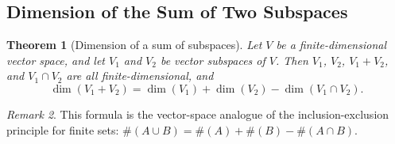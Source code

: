 \documentclass[11pt, a4paper, notitlepage]{report}
\newtheorem{theorem}{Theorem}[section]
\theoremstyle{definition}
\theoremstyle{remark}
\newtheorem{remark}[theorem]{Remark}
\begin{document}
\subsection{Dimension of the Sum of Two Subspaces}

\begin{theorem}[Dimension of a sum of subspaces]\label{thm:dim-sum}
Let $V$ be a finite-dimensional vector space, and let $V_1$ and $V_2$ be vector subspaces of $V$. Then $V_1$, $V_2$, $V_1 + V_2$, and $V_1\cap V_2$ are all finite-dimensional, and
\[
  \dim(V_1 + V_2) = \dim(V_1) + \dim(V_2) - \dim(V_1\cap V_2).
\]
\end{theorem}

\begin{remark}
This formula is the vector-space analogue of the inclusion-exclusion principle for finite sets:
$\#(A\cup B) = \#(A) + \#(B) - \#(A\cap B)$.
\end{remark}
\end{document}
